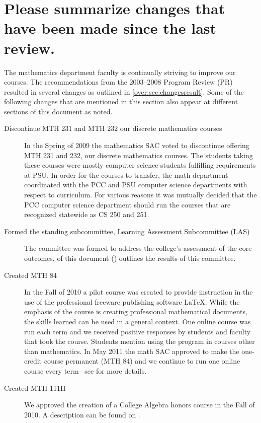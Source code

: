 \section{Please summarize changes that have been made since the last
review.}
The mathematics department faculty is continually striving to improve our
courses.  The recommendations from the 2003--2008 Program Review (PR) \cite{mathprogramreview2003}
resulted in several changes as outlined in \vref{over:sec:changesresult}.  Some of the following 
changes that are mentioned in this section also appear at different sections of this document
as noted.
\begin{description}
  \item[Discontinue MTH 231 and MTH 232 our discrete mathematics courses] In the Spring of 2009 
    the mathematics SAC voted to discontinue offering MTH
    231 and 232, our discrete mathematics courses.  The students taking these
    courses were mostly computer science students fulfilling requirements at
    PSU.  In order for the courses to transfer, the math department coordinated
    with the PCC and PSU computer science departments with respect to
    curriculum.  For various reasons it was mutually decided that the PCC
    computer science department should run the courses that are recognized
    statewide as CS 250 and 251. 
  \item[Formed the standing subcommittee, Learning Assessment Subcommittee
    (LAS)]
     The committee was formed to address the college's assessment of the core
    outcomes.   of this document () 
    outlines the results of this committee.    
  \item[Created MTH 84] In the Fall of 2010 a pilot course was created to provide
    instruction in the use of the professional freeware publishing software
    \LaTeX.   While the emphasis of the course is creating professional
    mathematical documents, the skills learned can be used in a general context.
    One online course was run each term and we received positive responses by
    students and faculty that took the course.  Students mention using the
    program in courses other than mathematics.   In May 2011 the math SAC
    approved to make the one-credit course permanent (MTH 84) and we continue to run one
    online course every term-- see  for more details.
  \item[Created MTH 111H] We approved the creation of a College Algebra honors
    course in the Fall of 2010.   A description can be found on .

\end{description}
